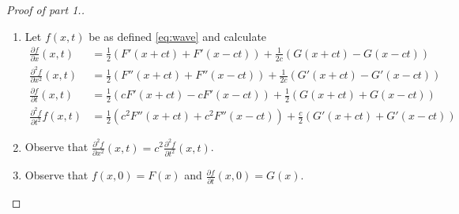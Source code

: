 \begin{proof}[Proof of part 1.]
    \begin{enumerate}
        \item Let \(f(x,t)\) be as defined \eqref{eq:wave} and calculate
              \[
                  \begin{aligned}
                      \tfrac{\partial f}{\partial x} (x,t)
                       & = \tfrac{1}{2} \left(F'(x+ct) + F'(x-ct)\right)
                      + \tfrac{1}{2c}\left(G(x+ct) - G(x-ct)\right)               \\
                      \tfrac{\partial^2 f}{\partial x^2}(x,t)
                       & = \tfrac{1}{2} \left(F''(x+ct) + F''(x-ct)\right)
                      + \tfrac{1}{2c}\left(G'(x+ct) - G'(x-ct)\right)             \\
                      \tfrac{\partial f}{\partial t} (x,t)
                       & = \tfrac{1}{2} \left(cF'(x+ct) - c F'(x-ct)\right)
                      + \tfrac{1}{2}\left(G(x+ct) + G(x-ct)\right)                \\
                      \tfrac{\partial^2 f}{\partial t^2} f(x,t)
                       & = \tfrac{1}{2} \left(c^2F''(x+ct) + c^2 F''(x-ct)\right)
                      + \tfrac{c}{2}\left(G'(x+ct) + G'(x-ct)\right)
                  \end{aligned}
              \]
        \item Observe that  \(   \frac{\partial^2 f}{\partial x^2}(x,t) = c^2  \frac{\partial^2 f}{\partial t^2}(x,t) \).
        \item Observe that \(f(x,0) = F(x)\)
              and \(\frac{\partial f}{\partial t}(x,0) = G(x)\).
    \end{enumerate}
\end{proof}



